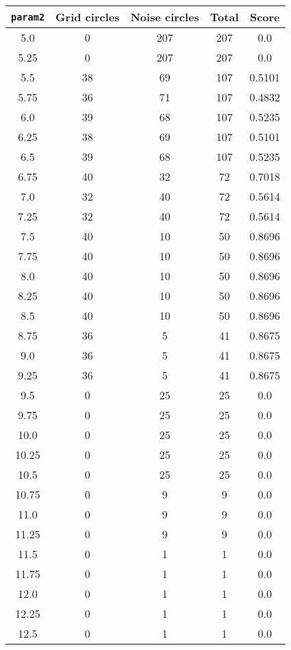 \documentclass[letterpaper, 12pt]{article}
\begin{document}
\begin{longtable}{|c|c|c|c|c|}
\hline
\textbf{\texttt{param2}} & \textbf{Grid circles} & \textbf{Noise circles} & \textbf{Total} & \textbf{Score} \\
\hline
5.0 & 0 & 207 & 207 & 0.0 \\
\hline
5.25 & 0 & 207 & 207 & 0.0 \\
\hline
5.5 & 38 & 69 & 107 & 0.5101 \\
\hline
5.75 & 36 & 71 & 107 & 0.4832 \\
\hline
6.0 & 39 & 68 & 107 & 0.5235 \\
\hline
6.25 & 38 & 69 & 107 & 0.5101 \\
\hline
6.5 & 39 & 68 & 107 & 0.5235 \\
\hline
6.75 & 40 & 32 & 72 & 0.7018 \\
\hline
7.0 & 32 & 40 & 72 & 0.5614 \\
\hline
7.25 & 32 & 40 & 72 & 0.5614 \\
\hline
7.5 & 40 & 10 & 50 & 0.8696 \\
\hline
7.75 & 40 & 10 & 50 & 0.8696 \\
\hline
8.0 & 40 & 10 & 50 & 0.8696 \\
\hline
8.25 & 40 & 10 & 50 & 0.8696 \\
\hline
8.5 & 40 & 10 & 50 & 0.8696 \\
\hline
8.75 & 36 & 5 & 41 & 0.8675 \\
\hline
9.0 & 36 & 5 & 41 & 0.8675 \\
\hline
9.25 & 36 & 5 & 41 & 0.8675 \\
\hline
9.5 & 0 & 25 & 25 & 0.0 \\
\hline
9.75 & 0 & 25 & 25 & 0.0 \\
\hline
10.0 & 0 & 25 & 25 & 0.0 \\
\hline
10.25 & 0 & 25 & 25 & 0.0 \\
\hline
10.5 & 0 & 25 & 25 & 0.0 \\
\hline
10.75 & 0 & 9 & 9 & 0.0 \\
\hline
11.0 & 0 & 9 & 9 & 0.0 \\
\hline
11.25 & 0 & 9 & 9 & 0.0 \\
\hline
11.5 & 0 & 1 & 1 & 0.0 \\
\hline
11.75 & 0 & 1 & 1 & 0.0 \\
\hline
12.0 & 0 & 1 & 1 & 0.0 \\
\hline
12.25 & 0 & 1 & 1 & 0.0 \\
\hline
12.5 & 0 & 1 & 1 & 0.0 \\

\end{longtable}
\end{document}
